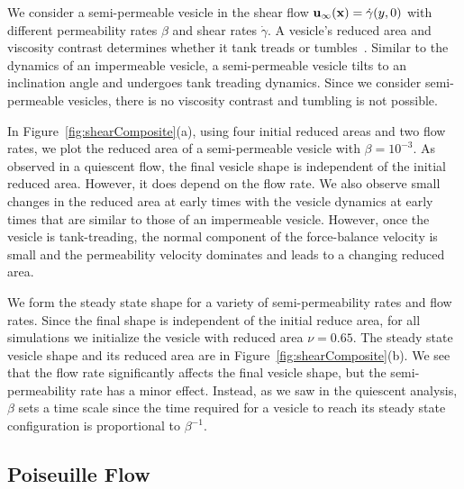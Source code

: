 \documentclass[9pt,twocolumn,twoside,lineno]{pnas-new}
\newif\ifTikz
\begin{document}
We consider a semi-permeable vesicle in the shear flow
$\mathbf{u}_{\infty}(\mathbf{x}) = \dot{\gamma} (y,0)$ with different permeability
rates $\beta$ and shear rates $\dot{\gamma}$. A vesicle's reduced area
and viscosity contrast determines whether it tank treads or
tumbles~\cite{fin-lam-sei-gom2008, kra-win-sei-lip1996}. Similar to the
dynamics of an impermeable vesicle, a semi-permeable vesicle tilts to an
inclination angle and undergoes tank treading dynamics. Since we
consider semi-permeable vesicles, there is no viscosity contrast and
tumbling is not possible. 

In Figure~\ref{fig:shearComposite}(a), using four initial reduced areas
and two flow rates, we plot the reduced area of a semi-permeable vesicle
with $\beta = 10^{-3}$. As observed in a quiescent flow, the final
vesicle shape is independent of the initial reduced area. However, it
does depend on the flow rate. We also observe small changes in the
reduced area at early times with the vesicle dynamics at early times
that are similar to those of an impermeable vesicle. However, once the
vesicle is tank-treading, the normal component of the force-balance
velocity is small and the permeability velocity dominates and leads to a
changing reduced area.

We form the steady state shape for a variety of semi-permeability rates
and flow rates. Since the final shape is independent of the initial
reduce area, for all simulations we initialize the vesicle with reduced
area $\nu = 0.65$. The steady state vesicle shape and its reduced
area are in Figure~\ref{fig:shearComposite}(b). We see that the flow
rate significantly affects the final vesicle shape, but the
semi-permeability rate has a minor effect. Instead, as we saw in the
quiescent analysis, $\beta$ sets a time scale since the time required
for a vesicle to reach its steady state configuration is proportional to
$\beta^{-1}$.

\subsection*{Poiseuille Flow}
\begin{figure*}[htp]
  
  \caption{\label{fig:parabolicComposite} (a) The steady state shape of a
  semi-permeable vesicle submerged in a Poiseuille flow with varying
  initial reduced areas and flow rates. (b) The steady-state inclination
  angle for four different flow velocities. The steady-state shapes are
  superimposed. (c) The reduced area of the slipper formed with the
  flow rate of 800 $\mu m/s$. (d) The vesicle shape shown with the
  background imposed flow. The channel width is 12.5 times larger than
  the vesicle radius. The corresponding reduced area for each shape is
  indicated by the marks in plot (c).}
\end{figure*}
\end{document}
